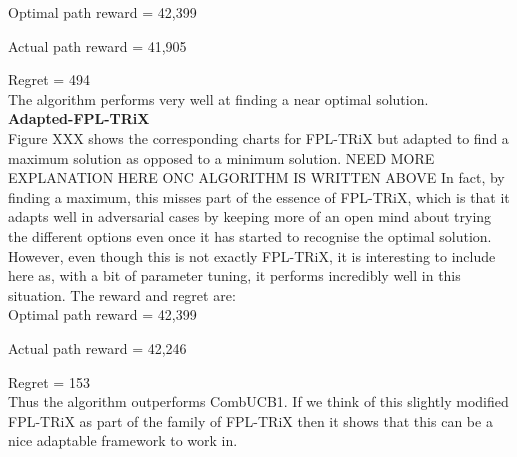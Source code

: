 Optimal path reward = 42,399

Actual path reward = 41,905

Regret = 494\\

The algorithm performs very well at finding a near optimal solution.\\

\noindent \textbf{Adapted-FPL-TRiX}\\

Figure XXX shows the corresponding charts for FPL-TRiX but adapted to find a maximum solution as opposed to a minimum solution. NEED MORE EXPLANATION HERE ONC ALGORITHM IS WRITTEN ABOVE In fact, by finding a maximum, this misses part of the essence of FPL-TRiX, which is that it adapts well in adversarial cases by keeping more of an open mind about trying the different options even once it has started to recognise the optimal solution. However, even though this is not exactly FPL-TRiX, it is interesting to include here as, with a bit of parameter tuning, it performs incredibly well in this situation. The reward and regret are:\\

Optimal path reward = 42,399

Actual path reward = 42,246

Regret = 153\\

Thus the algorithm outperforms CombUCB1. If we think of this slightly modified FPL-TRiX as part of the family of FPL-TRiX then it shows that this can be a nice adaptable framework to work in.\\

